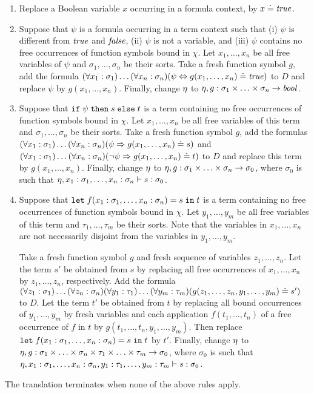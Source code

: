 \begin{enumerate}
  \item Replace a Boolean variable $x$ occurring in a formula context, by $x \doteq \mathit{true}$.

  \item Suppose that $\psi$ is a formula occurring in a term context such that (i) $\psi$ is different from $\mathit{true}$ and $\mathit{false}$, (ii) $\psi$ is not a variable, and (iii) $\psi$ contains no free occurrences of function symbols bound in $\chi$. Let $x_1,\ldots,x_n$ be all free variables of $\psi$ and $\sigma_1,\ldots,\sigma_n$ be their sorts. Take a fresh function symbol $g$, add the formula $(\forall x_1:\sigma_1)\ldots(\forall x_n:\sigma_n) (\psi \Leftrightarrow g(x_1,\ldots,x_n) \doteq \mathit{true})$ to $D$ and replace $\psi$ by $g(x_1,\ldots,x_n)$. Finally, change $\eta$ to $\eta,g : \sigma_1 \times \ldots \times \sigma_n \to \mathit{bool}$.

  \item Suppose that $\mathtt{if}\;{\psi}\;\allowbreak\mathtt{then}\;{s}\;\allowbreak\mathtt{else}\;{t}$ is a term containing no free occurrences of function symbols bound in $\chi$. Let $x_1,\ldots,x_n$ be all free variables of this term and $\sigma_1,\ldots,\sigma_n$ be their sorts. Take a fresh function symbol $g$, add the formulas $(\forall x_1:\sigma_1)\ldots(\forall x_n:\sigma_n) (\psi \Rightarrow g(x_1,\ldots,x_n) \doteq s)$ and $(\forall x_1:\sigma_1)\ldots(\forall x_n:\sigma_n) (\neg\psi \Rightarrow g(x_1,\ldots,x_n) \doteq t)$ to $D$ and replace this term by $g(x_1,\ldots,x_n)$. Finally, change $\eta$ to $\eta,g : \sigma_1 \times \ldots \times \sigma_n \to \sigma_0$, where $\sigma_0$ is such that $\eta,x_1:\sigma_1,\ldots,x_n:\sigma_n \vdash s : \sigma_0$.

  \item Suppose that $\mathtt{let}\;{f(x_1:\sigma_1, \ldots, x_n:\sigma_n)}={s}\;\allowbreak\mathtt{in}\;{t}$ is a term containing no free occurrences of function symbols bound in $\chi$. Let $y_1,\ldots,y_m$ be all free variables of this term and $\tau_1,\ldots,\tau_m$ be their sorts. Note that the variables in $x_1,\ldots,x_n$ are not necessarily disjoint from the variables in $y_1,\ldots,y_m$. 

Take a fresh function symbol $g$ and fresh sequence of variables $z_1,\ldots,z_n$. Let the term $s'$ be obtained from $s$ by replacing all free occurrences of $x_1,\ldots,x_n$ by $z_1,\ldots,z_n$, respectively. Add the formula $(\forall z_1:\sigma_1)\ldots(\forall z_n:\sigma_n) (\forall y_1:\tau_1)\ldots(\forall y_m:\tau_m) (g(z_1,\ldots,z_n,y_1,\ldots,\allowbreak y_m) \doteq s')$ to $D$. Let the term $t'$ be obtained from $t$ by replacing all bound occurrences of $y_1,\ldots,y_m$ by fresh variables and each application $f(t_1, \ldots, t_n)$ of a free occurrence of $f$ in $t$ by $g(t_1, \ldots, t_n,\allowbreak y_1, \ldots, y_m)$. Then replace $\mathtt{let}\;{f(x_1:\sigma_1, \ldots, x_n:\sigma_n)}={s}\;\allowbreak\mathtt{in}\;{t}$ by $t'$. Finally, change $\eta$ to $\eta,g : \sigma_1 \times \ldots \times \sigma_n \times \tau_1 \times \ldots \times \tau_m \to \sigma_0$, where $\sigma_0$ is such that $\eta,x_1:\sigma_1,\ldots,x_n:\sigma_n,y_1:\tau_1,\ldots,y_m:\tau_m \vdash s : \sigma_0$. 
\end{enumerate}
The translation terminates when none of the above rules apply.

